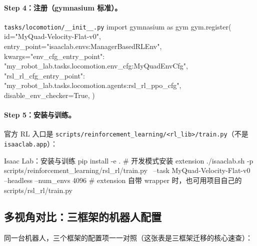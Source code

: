 \paragraph{Step 4：注册（gymnasium 标准）。}

\begin{codebox}[Python]{\texttt{tasks/locomotion/\_\_init\_\_.py}}
import gymnasium as gym
gym.register(
    id="MyQuad-Velocity-Flat-v0",
    entry_point="isaaclab.envs:ManagerBasedRLEnv",
    kwargs={"env_cfg_entry_point": "my_robot_lab.tasks.locomotion.env_cfg:MyQuadEnvCfg",
            "rsl_rl_cfg_entry_point": "my_robot_lab.tasks.locomotion.agents:rsl_rl_ppo_cfg"},
    disable_env_checker=True,
)
\end{codebox}

\paragraph{Step 5：安装与训练。}官方 RL 入口是 \verb|scripts/reinforcement_learning/<rl_lib>/train.py|（不是 \verb|isaaclab.app|）：

\begin{codebox}[bash]{Isaac Lab：安装与训练}
pip install -e .                              # 开发模式安装 extension
./isaaclab.sh -p scripts/reinforcement_learning/rsl_rl/train.py \
    --task MyQuad-Velocity-Flat-v0 --headless --num_envs 4096
# extension 自带 wrapper 时，也可用项目自己的 scripts/rsl_rl/train.py
\end{codebox}

\subsection{多视角对比：三框架的机器人配置}
\label{sec:rlmc-diy-isaac-compare}

同一台机器人，三个框架的配置项一一对照（这张表是三框架迁移的核心速查）：

